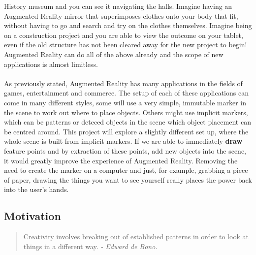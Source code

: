 \documentclass[11pt]{article}
\begin{document}
History museum and you can see it navigating the halls. Imagine having an
Augmented Reality mirror that superimposes clothes onto your body that fit, 
without having to go and search and try on the clothes themselves. Imagine being on a 
construction project and you are able to view the outcome on your tablet, even
if the old structure has not been cleared away for the new project to begin!
Augmented Reality can do all of the above already and the scope of new
applications is almost limitless.\\ 
\\
As previously stated, Augmented Reality has many applications in the
fields of games, entertainment and commerce. The setup of each of these
applications can come in many different styles, some will use a 
very simple, immutable marker in the scene to work out where to place
objects. Others might use implicit markers, which can be patterns or
deteced objects in the scene which object placement can be centred around. 
This project will explore a slightly different set up, where the whole
scene is built from implicit markers. If we are
able to immediately \textbf{draw} feature points and by extraction of these points, 
add new objects into the scene, it would greatly improve the 
experience of Augmented Reality. Removing the need to create the marker 
on a computer and just, for example, grabbing a piece of paper, drawing 
the things you want to see yourself really places the power back into
the user's hands.

\subsection{Motivation}
\begin{quote}
Creativity involves breaking out of established patterns in
		order to look at things in a different way. \textit{- Edward de Bono.}
\end{quote}
\end{document}
